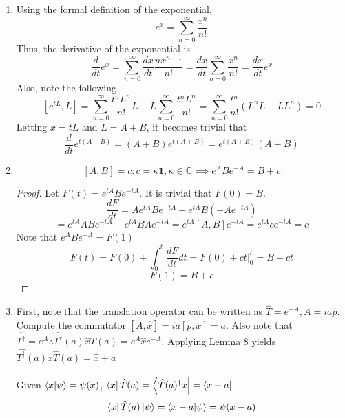 \newpage
\begin{sol}
\begin{enumerate}[label=\textbf{(\alph*)}]
\item
Using the formal definition of the exponential, 
$$e^{x}=\sum_{n=0}^\infty\frac{x^n}{n!}$$ 
Thus, the derivative of the exponential is
$$\frac{d}{dt}e^x=\sum_{n=0}^\infty\frac{dx}{dt}\frac{nx^{n-1}}{n!}=\frac{dx}{dt}\sum_{n=0}^\infty\frac{x^n}{n!}=\frac{dx}{dt}e^x$$ 
Also, note the following
$$[e^{tL},L]=\sum_{n=0}^\infty\frac{t^nL^n}{n!}L-L\sum_{n=0}^\infty\frac{t^nL^n}{n!}=\sum_{n=0}^\infty \frac{t^n}{n!}(L^nL-LL^n)=0$$
Letting $x=tL$ and $L=A+B$, it becomes trivial that
$$\frac{d}{dt}e^{t(A+B)}=(A+B)e^{t(A+B)}=e^{t(A+B)}(A+B)$$
\item
\begin{lemma}
$$[A,B]=c: c=\kappa\mathbf 1, \kappa\in\mathbb C\implies e^ABe^{-A}=B+c$$
\end{lemma}
\begin{proof}
Let $F(t)=e^{tA}Be^{-tA}$. It is trivial that $F(0)=B$.
$$\frac{dF}{dt}=Ae^{tA}Be^{-tA}+e^{tA}B(-Ae^{-tA})$$ $$=e^{tA}ABe^{-tA}-e^{tA}BAe^{-tA}=e^{tA}[A,B]e^{-tA}=e^{tA}ce^{-tA}=c$$
Note that $e^ABe^{-A}=F(1)$
$$F(t)=F(0)+\int_0^t\frac{dF}{dt}dt=F(0)+ct|_0^t=B+ct$$ 
$$F(1)=B+c$$ 
\end{proof}
\item
First, note that the translation operator can be written as $\hat T=e^{-A}, A=ia\hat p$.\\
Compute the commutator $[A,\hat x]=ia[p,x]=a$. Also note that $\hat{ T^\dagger}=e^A\therefore\hat{ T^\dagger}(a)\hat x\hat T(a)=e^A\hat x e^{-A}$. Applying Lemma 8 yields $\hat{ T^\dagger}(a)\hat x\hat T(a)=\hat x+a$\\\\
Given $\braket{x}{\psi}=\psi(x)$, $\bra x\hat T(a)=\bra{\hat T(a)^\dagger x}=\bra{x-a}$
$$\bra x\hat T(a)\ket\psi=\braket{x-a}{\psi}=\psi(x-a)$$
\end{enumerate}
\end{sol}